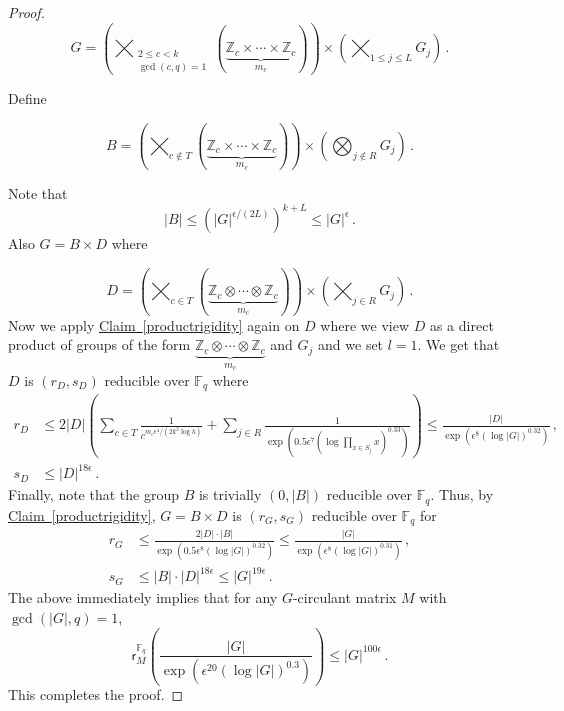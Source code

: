 \documentclass[11pt]{article}
\numberwithin{equation}{section}
\theoremstyle{definition}
\theoremstyle{plain}
\newcommand{\Z}{\mathbb Z}
\newcommand{\expref}[2]{\hyperref[#2]{#1~\ref{#2}}}
\theoremstyle{definition}
\newcommand\F{{\mathbb{F}}}
\renewcommand\Z{{\mathbb{Z}}}
\newcommand{\eps}{\epsilon}
\begin{document}
\begin{proof}
\[
G = \left( \bigtimes_{\substack{2 \leq c < k \\ \gcd(c,q) = 1}} \left( \underbrace{\Z_c \times \cdots \times \Z_c}_{\text{$m_c$}}\right) \right) \times \left(\bigtimes_{1 \leq j \leq L} G_j \right) \,.
\]

Define 

\[B = \left( \bigtimes_{c \notin T} \left( \underbrace{\Z_c \times \cdots \times \Z_c}_{\text{$m_c$}}\right) \right) \times \left(\bigotimes_{j \notin R} G_j \right) \,. \]

Note that 
\[
|B| \leq \left( |G|^{\epsilon/(2L)}\right)^{k + L} \leq |G|^{\epsilon} \,.
\]
Also $G = B \times D$ where

\[
D =  \left( \bigtimes_{c \in T} \left( \underbrace{\Z_c \otimes \cdots \otimes \Z_c}_{\text{$m_c$}}\right) \right) \times \left(\bigtimes_{j \in R} G_j \right) \,.
\]
Now we apply \expref{Claim}{productrigidity} again on $D$ where we view $D$ as a direct product of groups of the form $\underbrace{\Z_c \otimes \cdots \otimes \Z_c}_{\text{$m_c$}}$ and $G_j$ and we set $l = 1$.  We get that $D$ is $(r_D,s_D)$ reducible over $\F_q$ where
\begin{align*}
r_D &\leq 2|D|\left( \sum_{c \in T}\frac{1}{c^{m_c\epsilon^4/(2k^2 \log k)}} + \sum_{j \in R}\frac{1}{\exp\left(0.5\epsilon^7 (\log \prod_{x \in S_j}x )^{0.33}\right)} \right)  \leq \frac{|D|}{\exp\left(\epsilon^8 (\log |G|)^{0.32}\right)}\,, \\
s_D &\leq |D|^{18\eps} \,.
\end{align*}
Finally, note that the group $B$ is trivially $(0, |B|)$ reducible over $\F_q$.  Thus, by \expref{Claim}{productrigidity}, $G = B \times D$ is $(r_G,s_G)$ reducible over $\F_q$ for
\begin{align*}
r_G &\leq \frac{2|D| \cdot |B| }{\exp\left(0.5\epsilon^8 (\log |G|)^{0.32}\right)} \leq \frac{|G|}{\exp\left(\epsilon^{8}(\log |G|)^{0.31}\right)}\,, \\
s_G &\leq |B| \cdot |D|^{18\eps} \leq |G|^{19\eps} \,.
\end{align*}
The above immediately implies that for any $G$-circulant matrix $M$ with $\gcd(|G|,q) = 1$,
\[
\textsf{r}_M^{\F_q}\left( \frac{|G|}{\exp\left(\epsilon^{20}(\log |G|)^{0.3}\right)}\right) \leq |G|^{100 \epsilon} \,.
\]
This completes the proof. 

\end{proof}
\end{document}
